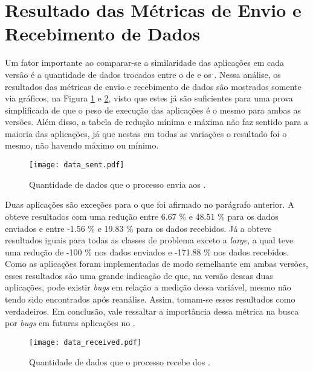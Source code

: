 \clearpage

\section{Resultado das Métricas de Envio e Recebimento de Dados}
\label{sec:metricasdados}

Um fator importante ao comparar-se a similaridade das aplicações em cada versão é a quantidade de dados trocados entre o \cluster de \IO e os \CCs. Nessa análise, os resultados das métricas de envio e recebimento de dados são mostrados somente via gráficos, na Figura \ref{fig:datasent} e \ref{fig:datareceived}, visto que estes já são suficientes para uma prova simplificada de que o peso de execução das aplicações é o mesmo para ambas as versões. Além disso, a tabela de redução mínima e máxima não faz sentido para a maioria das aplicações, já que nestas em todas as variações o resultado foi o mesmo, não havendo máximo ou mínimo.

\begin{figure}[h]
  \centering
  \caption{Quantidade de dados que o processo \master envia aos \slaves.}
  \label{fig:datasent}
  \texttt{[image: data\_sent.pdf]}
\end{figure}

\clearpage

Duas aplicações são exceções para o que foi afirmado no parágrafo anterior. A \KM obteve resultados com uma redução entre 6.67 \% e 48.51 \% para os dados enviados e entre -1.56 \% e 19.83 \% para os dados recebidos. Já a \LU obteve resultados iguais para todas as classes de problema exceto a \textit{large}, a qual teve uma redução de -100 \% nos dados enviados e -171.88 \% nos dados recebidos. Como as aplicações foram implementadas de modo semelhante em ambas versões, esses resultados são uma grande indicação de que, na versão \ASYNC dessas duas aplicações, pode existir \textit{bugs} em relação a medição dessa variável, mesmo não tendo sido encontrados após reanálise. Assim, tomam-se esses resultados como verdadeiros. Em conclusão, vale ressaltar a importância dessa métrica na busca por \textit{bugs} em futuras aplicações no \mppa.

\begin{figure}[h]
  \centering
  \caption{Quantidade de dados que o processo \master recebe dos \slaves.}
  \label{fig:datareceived}
  \texttt{[image: data\_received.pdf]}
\end{figure}

